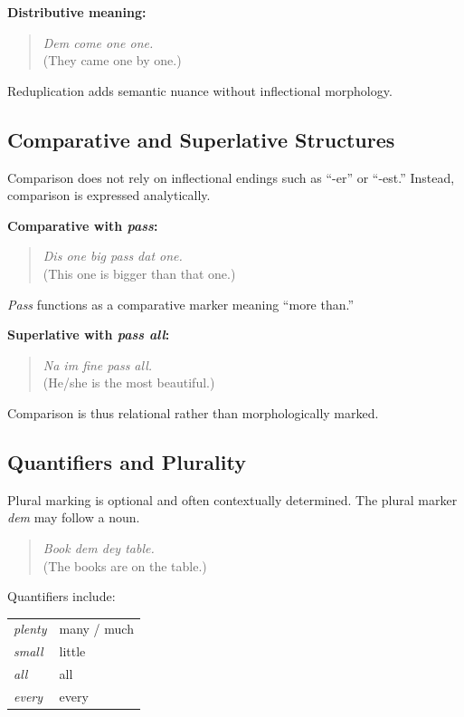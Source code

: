 \documentclass[12pt]{article}
\begin{document}
\textbf{Distributive meaning:}

\begin{quote}
\textit{Dem come one one.} \\
(They came one by one.)
\end{quote}

Reduplication adds semantic nuance without inflectional morphology.

\subsection{Comparative and Superlative Structures}

Comparison does not rely on inflectional endings such as “-er” or “-est.” Instead, comparison is expressed analytically.

\textbf{Comparative with \textit{pass}:}

\begin{quote}
\textit{Dis one big pass dat one.} \\
(This one is bigger than that one.)
\end{quote}

\textit{Pass} functions as a comparative marker meaning “more than.”

\textbf{Superlative with \textit{pass all}:}

\begin{quote}
\textit{Na im fine pass all.} \\
(He/she is the most beautiful.)
\end{quote}

Comparison is thus relational rather than morphologically marked.

\subsection{Quantifiers and Plurality}

Plural marking is optional and often contextually determined. The plural marker \textit{dem} may follow a noun.

\begin{quote}
\textit{Book dem dey table.} \\
(The books are on the table.)
\end{quote}

Quantifiers include:

\begin{center}
\begin{tabular}{ll}
\textit{plenty} & many / much \\
\textit{small} & little \\
\textit{all} & all \\
\textit{every} & every \\
\end{tabular}
\end{center}
\end{document}
